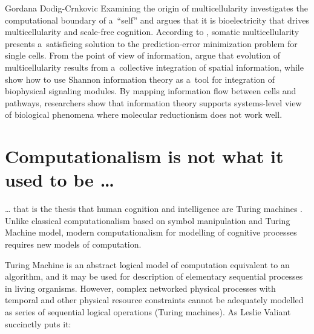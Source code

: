 \begin{artengenv}{Gordana Dodig-Crnkovic}
Examining the origin of multicellularity
\parencite[][]{fields_somatic_2019} %
 investigates the computational boundary of a~``self'' and argues that it is bioelectricity that drives multicellularity and scale-free cognition. According to 
\parencite[][]{fields_somatic_2019}, %
 somatic multicellularity presents a~satisficing solution to the prediction-error minimization problem for single cells. From the point of view of information, 
\parencite[][]{colizzi_evolution_2020} %
 argue that evolution of multicellularity results from a~collective integration of spatial information, while 
\parencite[][]{mcmillen_information_2022} %
 show how to use Shannon information theory 
\parencite[][]{shannon_mathematical_1948} %
 as a~tool for integration of biophysical signaling modules. By mapping information flow between cells and pathways, researchers show that information theory supports systems-level view of biological phenomena where molecular reductionism does not work well.

\section*{Computationalism is not what it used to be …}
… that is the thesis that human cognition and intelligence are Turing machines
\parencite[][]{scheutz_computationalism_2002}. %
 Unlike classical computationalism based on symbol manipulation and Turing Machine model, modern computationalism for modelling of cognitive processes requires new models of computation.

Turing Machine is an abstract logical model of computation equivalent to an algorithm, and it may be used for description of elementary sequential processes in living organisms. However, complex networked physical processes with temporal and other physical resource constraints cannot be adequately modelled as series of sequential logical operations (Turing machines). As Leslie Valiant
\parencite*[][]{valiant_probably_2013} %
 succinctly puts it:

\end{artengenv}
